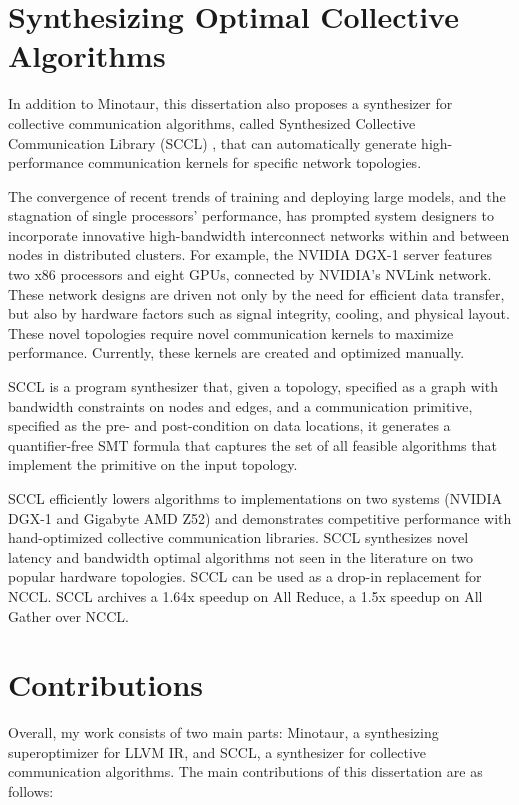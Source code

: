 \section{Synthesizing Optimal Collective Algorithms}

In addition to Minotaur, this dissertation also proposes a synthesizer
for collective communication algorithms, called Synthesized Collective
Communication Library (SCCL) , that can automatically generate
high-performance communication kernels for specific network
topologies.

The convergence of recent trends of training and deploying large
models, and the stagnation of single processors' performance, has
prompted system designers to incorporate innovative high-bandwidth
interconnect networks within and between nodes in distributed
clusters.
%
For example, the NVIDIA DGX-1 server features two x86 processors and
eight GPUs, connected by NVIDIA's NVLink network.
%
These network designs are driven not only by the need for efficient
data transfer, but also by hardware factors such as signal integrity,
cooling, and physical layout.
%
These novel topologies require novel communication kernels to maximize
performance.
%
Currently, these kernels are created and optimized manually.

SCCL is a program synthesizer that, given a topology, specified as a
graph with bandwidth constraints on nodes and edges, and a
communication primitive, specified as the pre- and post-condition on
data locations, it generates a quantifier-free SMT formula that
captures the set of all feasible algorithms that implement the
primitive on the input topology.

SCCL efficiently lowers algorithms to implementations on two systems
(NVIDIA DGX-1 and Gigabyte AMD Z52) and demonstrates competitive
performance with hand-optimized collective communication libraries.
SCCL synthesizes novel latency and bandwidth optimal algorithms not
seen in the literature on two popular hardware topologies. SCCL can be
used as a drop-in replacement for NCCL. SCCL archives a 1.64x speedup
on All Reduce, a 1.5x speedup on All Gather over NCCL.



\section{Contributions}

Overall, my work consists of two main parts: Minotaur, a synthesizing
superoptimizer for LLVM IR, and SCCL, a synthesizer for collective
communication algorithms. The main contributions of this dissertation
are as follows:


